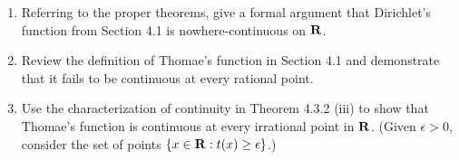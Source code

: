 \documentclass{lew98_solutions}
\begin{document}
\begin{exercise}
\label{ex:4.3.7}
    \begin{enumerate}
        \item Referring to the proper theorems, give a formal argument that Dirichlet's function from Section 4.1 is nowhere-continuous on \( \mathbf{R} \).

        \item Review the definition of Thomae's function in Section 4.1 and demonstrate that it fails to be continuous at every rational point.

        \item Use the characterization of continuity in Theorem 4.3.2 (iii) to show that Thomae's function is continuous at every irrational point in \( \mathbf{R} \). (Given \( \epsilon > 0 \), consider the set of points \( \{ x \in \mathbf{R} : t(x) \geq \epsilon \} \).)
    \end{enumerate}
\end{exercise}
\end{document}
